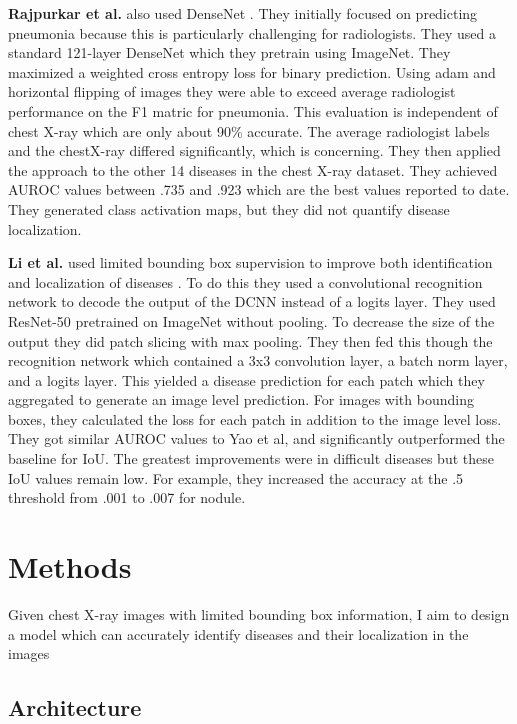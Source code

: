 \documentclass{article}
\begin{document}
{\bf Rajpurkar et al.} also used DenseNet \cite{Rajpurkar}. They initially focused on predicting pneumonia because this is particularly challenging for radiologists. They used a standard 121-layer DenseNet which they pretrain using ImageNet. They maximized a weighted cross entropy loss for binary prediction. Using adam and horizontal flipping of images they were able to exceed average radiologist performance on the F1 matric for pneumonia. This evaluation is independent of chest X-ray which are only about 90\% accurate. The average radiologist labels and the chestX-ray differed significantly, which is concerning. They then applied the approach to the other 14 diseases in the chest X-ray dataset. They achieved AUROC values between .735 and .923 which are the best values reported to date. They generated class activation maps, but they did not quantify disease localization.

{\bf Li et al.} used limited bounding box supervision to improve both identification and localization of diseases \cite{Li}. To do this they used a convolutional recognition network to decode the output of the DCNN instead of a logits layer. They used ResNet-50 pretrained on ImageNet without pooling. To decrease the size of the output they did patch slicing with max pooling. They then fed this though the recognition network which contained a 3x3 convolution layer, a batch norm layer, and a logits layer. This yielded a disease prediction for each patch which they aggregated to generate an image level prediction. For images with bounding boxes, they calculated the loss for each patch in addition to the image level loss. They got similar AUROC values to Yao et al, and significantly outperformed the baseline for IoU.  The greatest improvements were in difficult diseases but these IoU values remain low. For example, they increased the accuracy at the .5 threshold from .001 to .007 for nodule.

\section{Methods}
\label{Methods}

 Given chest X-ray images with limited bounding box information,
 I aim to design a model which can accurately identify diseases and their localization in the images

\subsection{Architecture}
\end{document}
